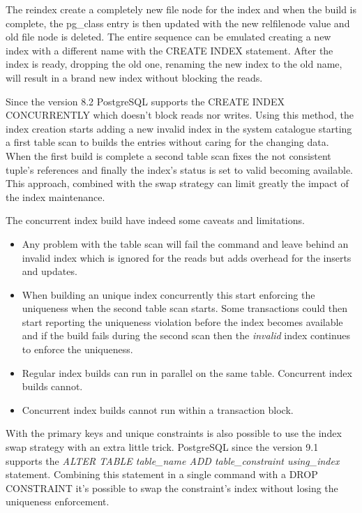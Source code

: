 The reindex create a completely new file node for the index and when the build is complete, the 
pg\_class entry is then updated with the new relfilenode value and old file node is deleted. The 
entire sequence can be emulated creating a new index with a different name with the CREATE 
INDEX statement. After the index is ready, dropping the old one, renaming 
the new index to the old name, will result in a brand new index without blocking the 
reads.\newline

Since the version 8.2 PostgreSQL supports the CREATE INDEX CONCURRENTLY which doesn't block reads nor writes. Using this method, the index creation 
starts adding a new invalid index in the system catalogue starting a first table scan to builds 
the entries without caring for the changing data. When the first build is complete a second table 
scan fixes the not consistent tuple's references and finally the index's status is set to valid 
becoming available. This approach, combined with the swap strategy can limit greatly the 
impact of the index maintenance. \newline

The concurrent index build have indeed some caveats and limitations.
\begin{itemize}
 \item Any problem with the table scan will fail the command and leave behind an invalid index 
which is ignored for the reads but adds overhead for the inserts and updates.
\item When building an unique index concurrently this start enforcing the uniqueness when the 
second table scan starts. Some transactions could then start reporting the uniqueness violation 
before the index becomes available and if the build fails during the second scan then 
the \textit{invalid} index continues to enforce the uniqueness.
\item Regular index builds can run in parallel on the same table. Concurrent index builds cannot.
\item Concurrent index builds cannot run within a transaction block.
\end{itemize}

With the primary keys and unique constraints is also possible to use the index swap strategy with 
an extra little trick. PostgreSQL since the version 9.1 supports the \textit{ALTER TABLE table\_name 
ADD table\_constraint using\_index} statement. Combining this statement in a single command with a 
DROP CONSTRAINT it's possible to swap the constraint's index without losing the uniqueness 
enforcement.

